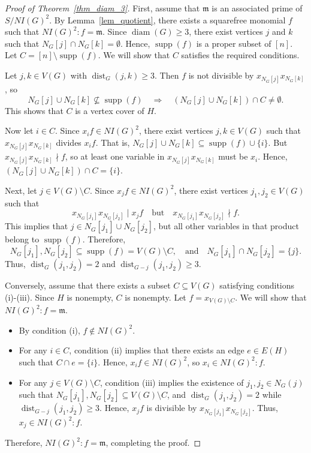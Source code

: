 \documentclass[12pt,reqno,twoside]{amsart}
\newcommand{\mm}{\mathfrak m}
\DeclareMathOperator{\diam}{diam}
\DeclareMathOperator{\dist}{dist}
\DeclareMathOperator{\supp}{supp}
\theoremstyle{definition}
\theoremstyle{plain}
\theoremstyle{remark}
\numberwithin{equation}{section}
\begin{document}
\begin{proof}[Proof of Theorem~\ref{thm_diam_3}]
First, assume that $\mm$ is an associated prime of $S/NI(G)^2$. By Lemma~\ref{lem_quotient}, there exists a squarefree monomial $f$ such that $NI(G)^2 : f = \mm$. Since $\diam(G) \geq 3$, there exist vertices $j$ and $k$ such that $N_G[j] \cap N_G[k] = \emptyset$. Hence, $\supp(f)$ is a proper subset of $[n]$. Let $C = [n] \setminus \supp(f)$. We will show that $C$ satisfies the required conditions.

Let $j, k \in V(G)$ with $\dist_G(j, k) \geq 3$. Then $f$ is not divisible by $x_{N_G[j]} x_{N_G[k]}$, so
\[
N_G[j] \cup N_G[k] \nsubseteq \supp(f) \quad \Longrightarrow \quad (N_G[j] \cup N_G[k]) \cap C \neq \emptyset.
\]
This shows that $C$ is a vertex cover of $H$.

Now let $i \in C$. Since $x_i f \in NI(G)^2$, there exist vertices $j, k \in V(G)$ such that $x_{N_G[j]} x_{N_G[k]}$ divides $x_i f$. That is, $N_G[j] \cup N_G[k] \subseteq \supp(f) \cup \{i\}$. But $x_{N_G[j]} x_{N_G[k]} \nmid f$, so at least one variable in $x_{N_G[j]} x_{N_G[k]}$ must be $x_i$. Hence, $(N_G[j] \cup N_G[k]) \cap C = \{i\}$.

Next, let $j \in V(G) \setminus C$. Since $x_j f \in NI(G)^2$, there exist vertices $j_1, j_2 \in V(G)$ such that
\[
x_{N_G[j_1]} x_{N_G[j_2]} \mid x_j f \quad \text{but} \quad x_{N_G[j_1]} x_{N_G[j_2]} \nmid f.
\]
This implies that $j \in N_G[j_1] \cup N_G[j_2]$, but all other variables in that product belong to $\supp(f)$. Therefore,
\[
N_G[j_1], N_G[j_2] \subseteq \supp(f) = V(G) \setminus C, \quad \text{and} \quad N_G[j_1] \cap N_G[j_2] = \{j\}.
\]
Thus, $\dist_G(j_1, j_2) = 2$ and $\dist_{G - j}(j_1, j_2) \geq 3$.

\medskip


Conversely, assume that there exists a subset $C \subseteq V(G)$ satisfying conditions (i)-(iii). Since $H$ is nonempty, $C$ is nonempty. Let $f = x_{V(G) \setminus C}.$ We will show that $NI(G)^2 : f = \mm$. 

\begin{itemize}
    \item By condition (i), $f \notin NI(G)^2$.
    \item For any $i \in C$, condition (ii) implies that there exists an edge $e \in E(H)$ such that $C \cap e = \{i\}$. Hence, $x_i f \in NI(G)^2$, so $x_i \in NI(G)^2 : f$.
    \item For any $j \in V(G) \setminus C$, condition (iii) implies the existence of $j_1, j_2 \in N_G(j)$ such that $N_G[j_1], N_G[j_2] \subseteq V(G) \setminus C$, and $\dist_G(j_1, j_2) = 2$ while $\dist_{G-j}(j_1, j_2) \geq 3$. Hence, $x_j f$ is divisible by $x_{N_G[j_1]} x_{N_G[j_2]}$. Thus, $x_j \in NI(G)^2 : f$.
\end{itemize}

Therefore, $NI(G)^2 : f = \mm$, completing the proof.
\end{proof}
\end{document}

